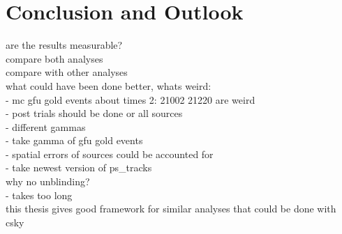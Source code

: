 \chapter{Conclusion and Outlook} \label{sec:outlook}
are the results measurable?\\
compare both analyses\\
compare with other analyses\\

what could have been done better, whats weird:\\
- mc gfu gold events about times 2: 21002 21220 are weird\\
- post trials should be done or all sources\\
- different gammas\\
- take gamma of gfu gold events\\
- spatial errors of sources could be accounted for\\
- take newest version of ps\_tracks\\
why no unblinding?\\
- takes too long\\

this thesis gives good framework for similar analyses that could be done with csky
